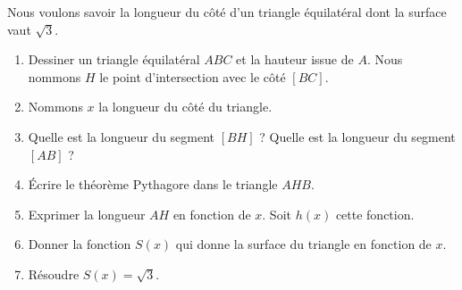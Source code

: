 
\begin{exercice}\label{exoSeconde-0063}

    Nous voulons savoir la longueur du côté d'un triangle équilatéral dont la surface vaut \( \sqrt{3}\).
    \begin{enumerate}
        \item
            Dessiner un triangle équilatéral \( ABC\) et la hauteur issue de \( A\). Nous nommons \( H\) le point d'intersection avec le côté \( [BC]\).
        \item
            Nommons \( x\) la longueur du côté du triangle.
        \item
            Quelle est la longueur du segment \( [BH]\) ? Quelle est la longueur du segment \( [AB]\) ?
        \item
            Écrire le théorème Pythagore dans le triangle \( AHB\).
        \item
            Exprimer la longueur \( AH\) en fonction de \( x\). Soit \( h(x)\) cette fonction.
        \item
            Donner la fonction \( S(x)\) qui donne la surface du triangle en fonction de \( x\).
        \item
            Résoudre \( S(x)=\sqrt{3}\).
    \end{enumerate}

\end{exercice}
